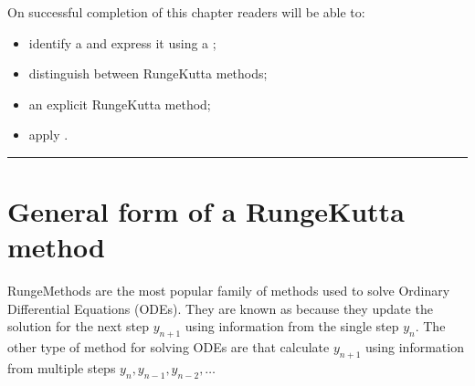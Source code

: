 \documentclass[letterpaper,10pt,english]{jupyterBook}
\begin{document}
\sphinxAtStartPar
On successful completion of this chapter readers will be able to:
\begin{itemize}
\item {} 
\sphinxAtStartPar
identify a {\hyperref[\detokenize{2_ERKs/2.0_ERKs:rk-definition}]{}} and express it using a {\hyperref[\detokenize{2_ERKs/2.0_ERKs:butcher-tableau-definition}]{}};

\item {} 
\sphinxAtStartPar
distinguish between {\hyperref[\detokenize{2_ERKs/2.0_ERKs:explicit-and-implicit-rk-methods-section}]{}} Runge\sphinxhyphen{}Kutta methods;

\item {} 
\sphinxAtStartPar
{\hyperref[\detokenize{2_ERKs/2.1_ERK_Derivation:rk2-derivation-section}]{}} an explicit Runge\sphinxhyphen{}Kutta method;

\item {} 
\sphinxAtStartPar
apply {\hyperref[\detokenize{2_ERKs/2.3_Solving_IVPs_using_ERK_methods:applying-erk-methods-to-solve-ivps-section}]{}}.

\end{itemize}


\bigskip\hrule\bigskip



\section{General form of a Runge\sphinxhyphen{}Kutta method}
\label{\detokenize{2_ERKs/2.0_ERKs:general-form-of-a-runge-kutta-method}}\label{\detokenize{2_ERKs/2.0_ERKs:general-form-of-a-rk-method-section}}
\sphinxAtStartPar
Runge\sphinxhyphen{}Methods are the most popular family of methods used to solve Ordinary Differential Equations (ODEs). They are known as  because they update the solution for the next step \(y_{n+1}\) using information from the single step \(y_n\). The other type of method for solving ODEs are  that calculate \(y_{n+1}\) using information from multiple steps \(y_n ,y_{n-1} ,y_{n-2} ,\ldots \)
\end{document}
